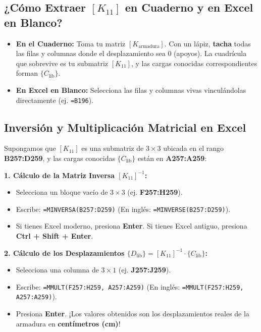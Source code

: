 \documentclass[10pt,a4paper]{article}
\begin{document}
\subsection{¿Cómo Extraer $[K_{11}]$ en Cuaderno y en Excel en Blanco?}
\begin{itemize}
    \item \textbf{En el Cuaderno:} Toma tu matriz $[K_{\text{armadura}}]$. Con un lápiz, \textbf{tacha} todas las filas y columnas donde el desplazamiento sea $0$ (apoyos). La cuadrícula que sobrevive es tu submatriz $[K_{11}]$, y las cargas conocidas correspondientes forman $\{C_{\text{lib}}\}$.
    \item \textbf{En Excel en Blanco:} Selecciona las filas y columnas vivas vinculándolas directamente (ej. \texttt{=B196}).
\end{itemize}

\subsection{Inversión y Multiplicación Matricial en Excel}
\begin{excelbox}
Supongamos que $[K_{11}]$ es una submatriz de $3 \times 3$ ubicada en el rango \textbf{B257:D259}, y las cargas conocidas $\{C_{\text{lib}}\}$ están en \textbf{A257:A259}:

\vspace{0.15cm}
\noindent\textbf{1. Cálculo de la Matriz Inversa $[K_{11}]^{-1}$:}
\begin{itemize}
    \item Selecciona un bloque vacío de $3 \times 3$ (ej. \textbf{F257:H259}).
    \item Escribe: \texttt{=MINVERSA(B257:D259)} \quad (En inglés: \texttt{=MINVERSE(B257:D259)}).
    \item Si tienes Excel moderno, presiona \textbf{Enter}. Si tienes Excel antiguo, presiona \textbf{Ctrl + Shift + Enter}.
\end{itemize}

\vspace{0.15cm}
\noindent\textbf{2. Cálculo de los Desplazamientos $\{D_{\text{lib}}\} = [K_{11}]^{-1} \cdot \{C_{\text{lib}}\}$:}
\begin{itemize}
    \item Selecciona una columna de $3 \times 1$ (ej. \textbf{J257:J259}).
    \item Escribe: \texttt{=MMULT(F257:H259, A257:A259)} \quad (En inglés: \texttt{=MMULT(F257:H259, A257:A259)}).
    \item Presiona \textbf{Enter}. ¡Los valores obtenidos son los desplazamientos reales de la armadura en \textbf{centímetros (cm)}!
\end{itemize}
\end{excelbox}
\end{document}

